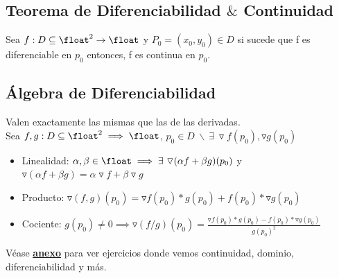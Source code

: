 \documentclass[10pt,a4paper]{article}
\begin{document}
\subsection*{Teorema de Diferenciabilidad $\&$ Continuidad}
Sea $f:D\subseteq \float^{2} \rightarrow \float$ y $P_{0} = (x_{0}, y_{0}) \in D$ si sucede que f es diferenciable en $p_{0}$ entonces, f es continua en $p_{0}$.
\subsection*{Álgebra de Diferenciabilidad}
Valen exactamente las mismas que las de las derivadas. \\
Sea $f, g: D \subseteq \float^{2} \implies \float$, $p_{0} \in D \ \backslash \ \exists \ \triangledown f(p_{0}), \triangledown g(p_{0})$ 
\begin{itemize}
    \item Linealidad: $\alpha, \beta \in \float \implies \exists \ \triangledown (\alpha f + \beta g) (p_{0})$ y $\triangledown(\alpha f + \beta g) = \alpha \triangledown f + \beta \triangledown g$
    \item Producto: $\triangledown (f, g)(p_{0}) = \triangledown f(p_{0}) * g(p_{0}) + f(p_{0}) * \triangledown g (p_{0})$
    \item Cociente: $g(p_{0}) \neq 0 \implies \triangledown(f/g)(p_{0}) = \frac{\triangledown f(p_{0}) * g(p_{0}) - f(p_{0}) * \triangledown g(p_{0})}{g(p_{0})^{2}}$
\end{itemize}
Véase \hyperref[subsec:diferenciabilidad_continuidad_mas]{\textbf{\underline{anexo}}} para ver ejercicios donde vemos continuidad, dominio, diferenciabilidad y más.
\end{document}
